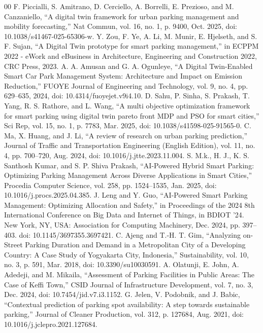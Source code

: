 \documentclass[conference]{IEEEtran}
\begin{document}
\begin{thebibliography}{00}
 F. Piccialli, S. Amitrano, D. Cerciello, A. Borrelli, E. Prezioso, and M. Canzaniello, “A digital twin framework for urban parking management and mobility forecasting,” Nat Commun, vol. 16, no. 1, p. 9400, Oct. 2025, doi: 10.1038/s41467-025-65306-w.
 Y. Zou, F. Ye, A. Li, M. Munir, E. Hjelseth, and S. F. Sujan, “A Digital Twin prototype for smart parking management,” in ECPPM 2022 - eWork and eBusiness in Architecture, Engineering and Construction 2022, CRC Press, 2023.
 A. A. Amusan and G. A. Ogunleye, “A Digital Twin-Enabled Smart Car Park Management System: Architecture and Impact on Emission Reduction,” FUOYE Journal of Engineering and Technology, vol. 9, no. 4, pp. 629–635, 2024, doi: 10.4314/fuoyejet.v9i4.10.
 D. Sahu, P. Sinha, S. Prakash, T. Yang, R. S. Rathore, and L. Wang, “A multi objective optimization framework for smart parking using digital twin pareto front MDP and PSO for smart cities,” Sci Rep, vol. 15, no. 1, p. 7783, Mar. 2025, doi: 10.1038/s41598-025-91565-0.
 C. Ma, X. Huang, and J. Li, “A review of research on urban parking prediction,” Journal of Traffic and Transportation Engineering (English Edition), vol. 11, no. 4, pp. 700–720, Aug. 2024, doi: 10.1016/j.jtte.2023.11.004.
 S. M.k., H. J., K. S. Santhosh Kumar, and S. P. Shiva Prakash, “AI-Powered Hybrid Smart Parking: Optimizing Parking Management Across Diverse Applications in Smart Cities,” Procedia Computer Science, vol. 258, pp. 1524–1535, Jan. 2025, doi: 10.1016/j.procs.2025.04.385.
 J. Leng and Y. Guo, “AI-Powered Smart Parking Management: Optimizing Allocation and Safety,” in Proceedings of the 2024 8th International Conference on Big Data and Internet of Things, in BDIOT ’24. New York, NY, USA: Association for Computing Machinery, Dec. 2024, pp. 397–403. doi: 10.1145/3697355.3697421.
 C. Ajeng and T.-H. T. Gim, “Analyzing on-Street Parking Duration and Demand in a Metropolitan City of a Developing Country: A Case Study of Yogyakarta City, Indonesia,” Sustainability, vol. 10, no. 3, p. 591, Mar. 2018, doi: 10.3390/su10030591.
 A. Olatunji, E. John, A. Adedeji, and M. Mikaila, “Assessment of Parking Facilities in Public Areas: The Case of Keffi Town,” CSID Journal of Infrastructure Development, vol. 7, no. 3, Dec. 2024, doi: 10.7454/jid.v7.i3.1152.
 G. Jelen, V. Podobnik, and J. Babic, “Contextual prediction of parking spot availability: A step towards sustainable parking,” Journal of Cleaner Production, vol. 312, p. 127684, Aug. 2021, doi: 10.1016/j.jclepro.2021.127684.

\end{thebibliography}
\end{document}

